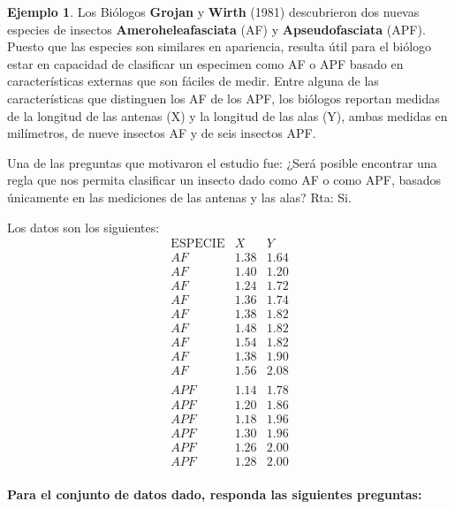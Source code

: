 \documentclass[
]{book}
\theoremstyle{definition}
\theoremstyle{definition}
\newtheorem{example}{Ejemplo}[chapter]
\theoremstyle{definition}
\theoremstyle{definition}
\theoremstyle{remark}
\begin{document}
\begin{example}
\protect\hypertarget{exm:ejemplo-distancias}{}\label{exm:ejemplo-distancias}Los Biólogos \textbf{Grojan} y \textbf{Wirth} (1981) descubrieron dos nuevas especies de insectos \textbf{Ameroheleafasciata} (AF) y \textbf{Apseudofasciata} (APF). Puesto que las especies son similares en apariencia, resulta útil para el biólogo estar en capacidad de clasificar un especimen como AF o APF basado en características externas que son fáciles de medir. Entre alguna de las características que distinguen los AF de los APF, los biólogos reportan medidas de la longitud de las antenas (X) y la longitud de las alas (Y), ambas medidas en milímetros, de nueve insectos AF y de seis insectos APF.

Una de las preguntas que motivaron el estudio fue: ¿Será posible encontrar una regla que nos permita clasificar un insecto dado como AF o como APF, basados únicamente en las mediciones de las antenas y las alas? Rta: Si.

Los datos son los siguientes:
\[
\begin{array}{ccc}
\text{ESPECIE} & X & Y \\\hline
AF & 1.38 & 1.64 \\
AF & 1.40 & 1.20 \\
AF & 1.24 & 1.72 \\
AF & 1.36 & 1.74 \\
AF & 1.38 & 1.82 \\
AF & 1.48 & 1.82 \\
AF & 1.54 & 1.82 \\
AF & 1.38 & 1.90 \\
AF & 1.56 & 2.08 \\
&&\\
APF & 1.14 & 1.78 \\
APF & 1.20 & 1.86 \\
APF & 1.18 & 1.96 \\
APF & 1.30 & 1.96 \\
APF & 1.26 & 2.00 \\
APF & 1.28 & 2.00 \\
\end{array}
\]
\end{example}

\textbf{Para el conjunto de datos dado, responda las siguientes preguntas:}
\end{document}
